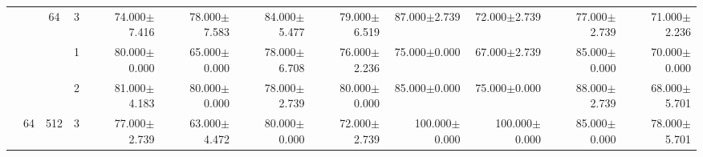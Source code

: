 \begin{table}[htpb]
{\begin{tabular}{c|c|c|c|rr|rr|rr|rr}
                                 &                                                                                 & \multirow{-3}{*}{64}                                                                   & 3                                                                                         & 74.000$\pm$7.416                        & 78.000$\pm$7.583                        & 84.000$\pm$5.477                        & 79.000$\pm$6.519                        & 87.000$\pm$2.739                         & 72.000$\pm$2.739                         & 77.000$\pm$2.739                        & 71.000$\pm$2.236                       \\ \cline{3-12} 
                                 &                                                                                 &                                                                                        & 1                                                                                         & 80.000$\pm$0.000                        & 65.000$\pm$0.000                        & 78.000$\pm$6.708                        & 76.000$\pm$2.236                        & 75.000$\pm$0.000                         & 67.000$\pm$2.739                         & 85.000$\pm$0.000                        & 70.000$\pm$0.000                       \\
                                 &                                                                                 &                                                                                        & 2                                                                                         & 81.000$\pm$4.183                        & 80.000$\pm$0.000                        & 78.000$\pm$2.739                        & 80.000$\pm$0.000                        & 85.000$\pm$0.000                         & 75.000$\pm$0.000                         & 88.000$\pm$2.739                        & 68.000$\pm$5.701                       \\
                                 & \multirow{-6}{*}{64}                                                            & \multirow{-3}{*}{512}                                                                  & 3                                                                                         & 77.000$\pm$2.739                        & 63.000$\pm$4.472                        & 80.000$\pm$0.000                        & 72.000$\pm$2.739                        & {\color[HTML]{FE0000} 100.000$\pm$0.000} & {\color[HTML]{FE0000} 100.000$\pm$0.000} & 85.000$\pm$0.000                        & 78.000$\pm$5.701                       \\ \cline{2-12} 

\end{tabular}}
\end{table}
